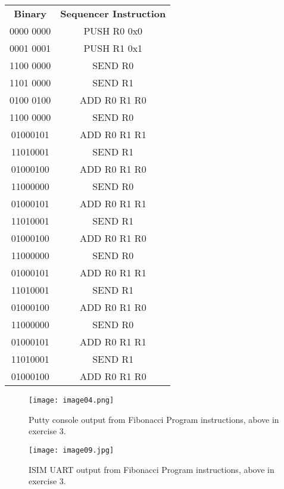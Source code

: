 \documentclass{article}
\begin{document}
\begin{center}
\begin{tabular}{ c c}

 \textbf{Binary} & \textbf{Sequencer Instruction} \\ 
	0000 0000 & PUSH R0 0x0 \\	
	0001 0001 & PUSH R1 0x1 \\
	1100 0000	 & SEND R0 \\
	1101 0000	 & SEND R1 \\
	0100 0100 & ADD R0 R1 R0 \\
	1100 0000	 & SEND R0 \\
	01000101	& ADD R0 R1 R1 \\
	11010001	& SEND R1 \\
	01000100	& ADD R0 R1 R0 \\
	11000000	& SEND R0 \\
	01000101	& ADD R0 R1 R1 \\
	11010001	& SEND R1 \\
	01000100	& ADD R0 R1 R0 \\
	11000000	& SEND R0 \\
	01000101	& ADD R0 R1 R1 \\
	11010001	& SEND R1 \\
	01000100	& ADD R0 R1 R0 \\
	11000000	& SEND R0 \\
	01000101	& ADD R0 R1 R1 \\
	11010001	& SEND R1 \\
	01000100	& ADD R0 R1 R0 \\

 
\end{tabular}
\end{center}

\begin{figure}[H]
\begin{center}
\texttt{[image: image04.png]} 
\caption{Putty console output from Fibonacci Program instructions, above in exercise 3.}
\end{center}
\end{figure}

\begin{figure}[H]
\begin{center}
\texttt{[image: image09.jpg]} 
\caption{ISIM UART output from Fibonacci Program instructions, above in exercise 3.}
\end{center}
\end{figure}
\end{document}
